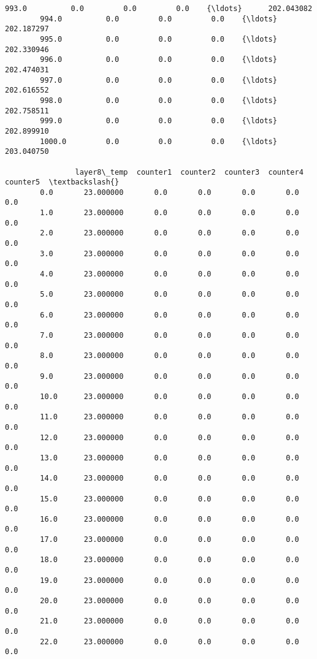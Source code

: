 \documentclass[11pt]{article}
\begin{document}
\begin{Verbatim}[commandchars=\\\{\}]
        993.0          0.0         0.0         0.0    {\ldots}      202.043082   
        994.0          0.0         0.0         0.0    {\ldots}      202.187297   
        995.0          0.0         0.0         0.0    {\ldots}      202.330946   
        996.0          0.0         0.0         0.0    {\ldots}      202.474031   
        997.0          0.0         0.0         0.0    {\ldots}      202.616552   
        998.0          0.0         0.0         0.0    {\ldots}      202.758511   
        999.0          0.0         0.0         0.0    {\ldots}      202.899910   
        1000.0         0.0         0.0         0.0    {\ldots}      203.040750   
        
                layer8\_temp  counter1  counter2  counter3  counter4  counter5  \textbackslash{}
        0.0       23.000000       0.0       0.0       0.0       0.0       0.0   
        1.0       23.000000       0.0       0.0       0.0       0.0       0.0   
        2.0       23.000000       0.0       0.0       0.0       0.0       0.0   
        3.0       23.000000       0.0       0.0       0.0       0.0       0.0   
        4.0       23.000000       0.0       0.0       0.0       0.0       0.0   
        5.0       23.000000       0.0       0.0       0.0       0.0       0.0   
        6.0       23.000000       0.0       0.0       0.0       0.0       0.0   
        7.0       23.000000       0.0       0.0       0.0       0.0       0.0   
        8.0       23.000000       0.0       0.0       0.0       0.0       0.0   
        9.0       23.000000       0.0       0.0       0.0       0.0       0.0   
        10.0      23.000000       0.0       0.0       0.0       0.0       0.0   
        11.0      23.000000       0.0       0.0       0.0       0.0       0.0   
        12.0      23.000000       0.0       0.0       0.0       0.0       0.0   
        13.0      23.000000       0.0       0.0       0.0       0.0       0.0   
        14.0      23.000000       0.0       0.0       0.0       0.0       0.0   
        15.0      23.000000       0.0       0.0       0.0       0.0       0.0   
        16.0      23.000000       0.0       0.0       0.0       0.0       0.0   
        17.0      23.000000       0.0       0.0       0.0       0.0       0.0   
        18.0      23.000000       0.0       0.0       0.0       0.0       0.0   
        19.0      23.000000       0.0       0.0       0.0       0.0       0.0   
        20.0      23.000000       0.0       0.0       0.0       0.0       0.0   
        21.0      23.000000       0.0       0.0       0.0       0.0       0.0   
        22.0      23.000000       0.0       0.0       0.0       0.0       0.0   

\end{Verbatim}
\end{document}
